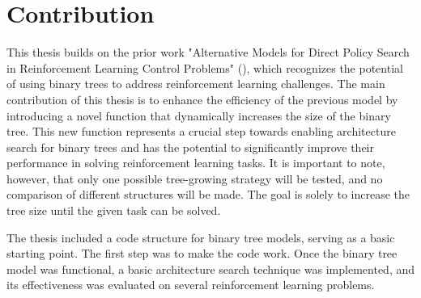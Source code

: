 \section{Contribution}

This thesis builds on the prior work "Alternative Models for Direct Policy Search in Reinforcement Learning Control Problems" (\cite{masanti_alternative_nodate}), which recognizes the potential of using binary trees to address reinforcement learning challenges. The main contribution of this thesis is to enhance the efficiency of the previous model by introducing a novel function that dynamically increases the size of the binary tree. This new function represents a crucial step towards enabling architecture search for binary trees and has the potential to significantly improve their performance in solving reinforcement learning tasks. It is important to note, however, that only one possible tree-growing strategy will be tested, and no comparison of different structures will be made. The goal is solely to increase the tree size until the given task can be solved.

The thesis included a code structure for binary tree models, serving as a basic starting point. The first step was to make the code work. Once the binary tree model was functional, a basic architecture search technique was implemented, and its effectiveness was evaluated on several reinforcement learning problems.
